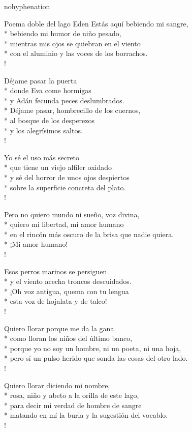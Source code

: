 \documentclass[
    a5paper,
    DIV=10,
    12pt,
    notitlepage,
    oneside,]
{scrbook} %
\begin{document}
\begin{hyphenrules}{nohyphenation}
\begin{poem}{Poema doble del lago Eden}{}{\vspace{-1em}}
Estás aquí bebiendo mi sangre,\\*
bebiendo mi humor de niño pesado,\\*
mientras mis ojos se quiebran en el viento\\*
con el aluminio y las voces de los borrachos.\\!

Déjame pasar la puerta\\*
donde Eva come hormigas\\*
y Adán fecunda peces deslumbrados.\\*
Déjame pasar, hombrecillo de los cuernos,\\*
al bosque de los desperezos\\*
y los alegrísimos saltos.\\!

Yo sé el uso más secreto\\*
que tiene un viejo alfiler oxidado\\*
y sé del horror de unos ojos despiertos\\*
sobre la superficie concreta del plato.\\!

Pero no quiero mundo ni sueño, voz divina,\\*
quiero mi libertad, mi amor humano\\*
en el rincón más oscuro de la brisa que nadie quiera.\\*
¡Mi amor humano! \\!

Esos perros marinos se persiguen\\*
y el viento acecha troncos descuidados.\\*
¡Oh voz antigua, quema con tu lengua\\*
esta voz de hojalata y de talco! \\!

Quiero llorar porque me da la gana\\*
como lloran los niños del último banco,\\*
porque yo no soy un hombre, ni un poeta, ni una hoja,\\*
pero sí un pulso herido que sonda las cosas del otro lado.\\!

Quiero llorar diciendo mi nombre,\\*
rosa, niño y abeto a la orilla de este lago,\\*
para decir mi verdad de hombre de sangre\\*
matando en mí la burla y la sugestión del vocablo.\\!


\end{poem}
\end{hyphenrules}
\end{document}
